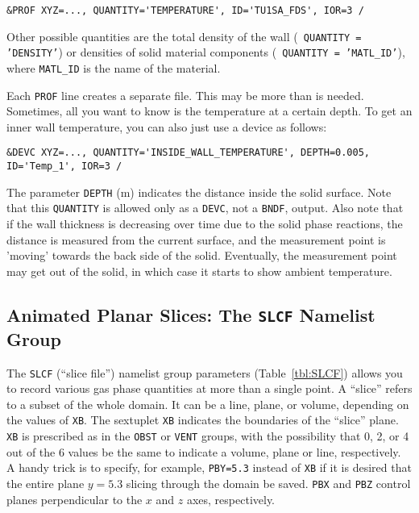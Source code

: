 \documentclass[11pt]{book}
\newcommand{\ct}{\tt\small}
\begin{document}
\footnotesize
\begin{verbatim}
&PROF XYZ=..., QUANTITY='TEMPERATURE', ID='TU1SA_FDS', IOR=3 /
\end{verbatim} \normalsize

\noindent
Other possible quantities are the total density of the wall ({\ct
QUANTITY = 'DENSITY'}) or densities of solid material components ({\ct
QUANTITY = 'MATL\_ID'}), where {\ct MATL\_ID} is the name of the
material.

Each {\ct PROF} line creates a separate file. This may be more than is
needed. Sometimes, all you want to know is the temperature at a
certain depth. To get an inner wall temperature, you can also just use
a device as follows:

\footnotesize
\begin{verbatim}
&DEVC XYZ=..., QUANTITY='INSIDE_WALL_TEMPERATURE', DEPTH=0.005, ID='Temp_1', IOR=3 /
\end{verbatim} \normalsize

\noindent
The parameter {\ct DEPTH} (m) indicates the distance inside the solid surface.
Note that this {\ct QUANTITY} is allowed only as a {\ct DEVC}, not a
{\ct BNDF}, output. Also note that if the wall thickness is decreasing
over time due to the solid phase reactions, the distance is
measured from the current surface, and the measurement point is
'moving' towards the back side of the solid. Eventually, the
measurement point may get out of the solid, in which case it starts to
show ambient temperature.


\subsection{Animated Planar Slices: The \texorpdfstring{{\tt SLCF}}{SLCF} Namelist Group}%
\label{info:SLCF}

The {\ct SLCF} (``slice file'') namelist group parameters (Table~\ref{tbl:SLCF})
allows you to record various gas phase quantities
at more than a single point. A ``slice'' refers to a subset of the whole domain. It can be a line,
plane, or volume, depending on the values of {\ct XB}.
The sextuplet {\ct XB} indicates the boundaries of the ``slice'' plane.
{\ct XB} is prescribed as in the {\ct OBST} or {\ct VENT} groups, with
the possibility that 0, 2, or 4 out of the 6 values be the same to
indicate a volume, plane or line, respectively. A handy trick is to
specify, for example, {\ct PBY=5.3} instead of {\ct XB} if it is desired
that the entire plane $y=5.3$ slicing through the domain be saved.
{\ct PBX} and {\ct PBZ} control planes perpendicular to the
$x$ and $z$ axes, respectively.
\end{document}
